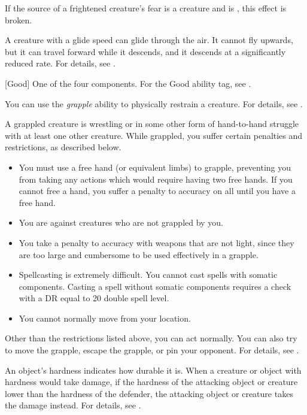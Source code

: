 If the source of a frightened creature's fear is a creature and is , this effect is broken.

 A creature with a glide speed can glide through the air.
It cannot fly upwards, but it can travel forward while it descends, and it descends at a significantly reduced rate.
For details, see .

[Good] One of the four  components. For the Good ability tag, see .

 You can use the \textit{grapple} ability to physically restrain a creature.
For details, see .

 A grappled creature is wrestling or in some other form of hand-to-hand struggle with at least one other creature.
While grappled, you suffer certain penalties and restrictions, as described below.
\begin{itemize}
    \item You must use a free hand (or equivalent limbs) to grapple, preventing you from taking any actions which would require having two free hands.
        If you cannot free a hand, you suffer a  penalty to accuracy on all  until you have a free hand.
    \item You are  against creatures who are not grappled by you.
    \item You take a  penalty to accuracy with weapons that are not light, since they are too large and cumbersome to be used effectively in a grapple.
    \item Spellcasting is extremely difficult. You cannot cast spells with somatic components.
        Casting a spell without somatic components requires a  check with a DR equal to 20 \add double spell level.
    \item You cannot normally move from your location. 
\end{itemize}

Other than the restrictions listed above, you can act normally. You can also try to move the grapple, escape the grapple, or pin your opponent. For details, see .

 An object's hardness indicates how durable it is.
When a creature or object with hardness would take damage, if the hardness of the attacking object or creature lower than the hardness of the defender, the attacking object or creature takes the damage instead.
For details, see .

